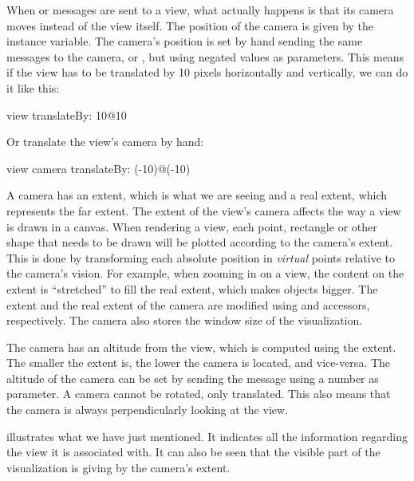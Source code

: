 \documentclass[a4paper,10pt,twoside]{book}
\begin{document}
When  or  messages are sent to a view, what actually happens is that its camera moves instead of the view itself. The position of the camera is given by the  instance variable. The camera's position is set by hand sending the same messages to the camera,  or , but using negated values as parameters. This means if the view has to be translated by 10 pixels horizontally and vertically, we can do it like this:

\begin{code}{}
view translateBy: 10@10
\end{code}

Or translate the view's camera by hand:

\begin{code}{}
view camera translateBy: (-10)@(-10)
\end{code}

A camera has an extent, which is what we are seeing and a real extent, which represents the far extent. 
The extent of the view's camera affects the way a view is drawn in a canvas. When rendering a view, each point, rectangle or other shape that needs to be drawn will be plotted according to the camera's extent. This is done by transforming each absolute position in \emph{virtual} points relative to the camera's vision.
For example, when zooming in on a view, the content on the extent is ``stretched'' to fill the real extent, which makes objects bigger.
The extent and the real extent of the camera are modified using  and  accessors, respectively. The camera also stores the window size of the visualization.

The camera has an altitude from the view, which is computed using the extent. The smaller the extent is, the lower the camera is located, and vice-versa. The altitude of the camera can be set by sending the  message using a number as parameter.
A camera cannot be rotated, only translated. This also means that the camera is always perpendicularly looking at the view.

 illustrates what we have just mentioned. It indicates all the  information regarding the view it is associated with. It can also be seen that the visible part of the visualization is giving by the camera's extent.
\end{document}
